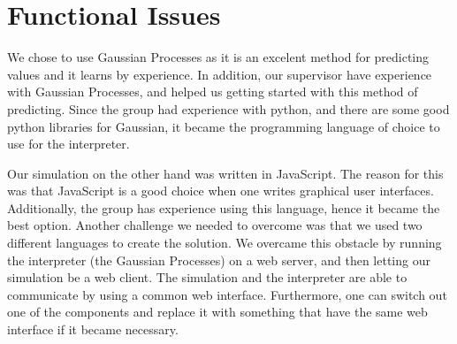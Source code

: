 \section {Functional Issues}

We chose to use Gaussian Processes as it is an excelent method for predicting values and it learns by experience. In addition, our supervisor have experience with Gaussian Processes, and helped us getting started with this method of predicting. Since the group had experience with python, and there are some good python libraries for Gaussian, it became the programming language of choice to use for the interpreter.

Our simulation on the other hand was written in JavaScript. The reason for this was that JavaScript is a good choice when one writes graphical user interfaces. Additionally, the group has experience using this language, hence it became the best option. Another challenge we needed to overcome was that we used two different languages to create the solution. We overcame this obstacle by running the interpreter (the Gaussian Processes) on a web server, and then letting our simulation be a web client. The simulation and the interpreter are able to communicate by using a common web interface. Furthermore, one can switch out one of the components and replace it with something that have the same web interface if it became necessary.
